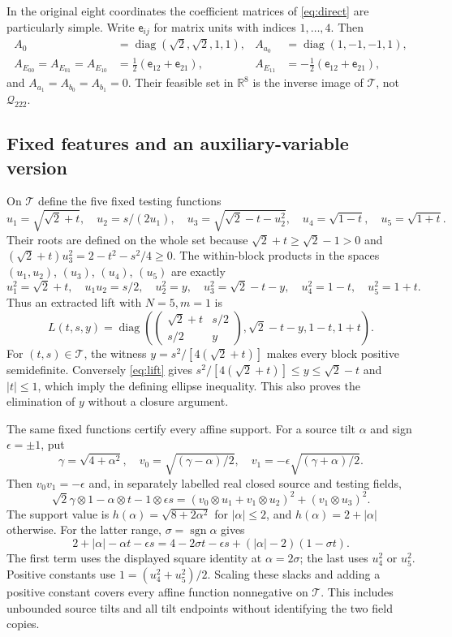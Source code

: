 \documentclass[11pt]{article}
\newcommand{\R}{\mathbb R}
\newcommand{\Q}{\mathcal Q_{222}}
\begin{document}
In the original eight coordinates the coefficient matrices of
\eqref{eq:direct} are particularly simple. Write $\mathsf e_{ij}$ for matrix
units with indices $1,\ldots,4$. Then
\[
 \begin{aligned}
 A_0&=\operatorname{diag}(\sqrt2,\sqrt2,1,1),&
 A_{a_0}&=\operatorname{diag}(1,-1,-1,1),\\
 A_{E_{00}}=A_{E_{01}}=A_{E_{10}}
   &=\tfrac12(\mathsf e_{12}+\mathsf e_{21}),&
 A_{E_{11}}&=-\tfrac12(\mathsf e_{12}+\mathsf e_{21}),
 \end{aligned}
\]
and $A_{a_1}=A_{b_0}=A_{b_1}=0$. Their feasible set in $\R^8$ is
the inverse image of $\mathcal T$, not $\Q$.

\subsection{Fixed features and an auxiliary-variable version}

On $\mathcal T$ define the five fixed testing functions
\[
 u_1=\sqrt{\sqrt2+t},\quad u_2=s/(2u_1),\quad
 u_3=\sqrt{\sqrt2-t-u_2^2},\quad
 u_4=\sqrt{1-t},\quad u_5=\sqrt{1+t}.
\]
Their roots are defined on the whole set because
$\sqrt2+t\geq\sqrt2-1>0$ and
$(\sqrt2+t)u_3^2=2-t^2-s^2/4\geq0$. The within-block products in
the spaces $(u_1,u_2)$, $(u_3)$, $(u_4)$, $(u_5)$ are exactly
\[
 u_1^2=\sqrt2+t,\quad u_1u_2=s/2,\quad u_2^2=y,\quad
 u_3^2=\sqrt2-t-y,\quad u_4^2=1-t,\quad u_5^2=1+t.
\]
Thus an extracted lift with $N=5,m=1$ is
\begin{equation}
 L(t,s,y)=\operatorname{diag}\left(
 \begin{pmatrix}\sqrt2+t&s/2\\s/2&y\end{pmatrix},
 \sqrt2-t-y,1-t,1+t\right).                 \label{eq:lift}
\end{equation}
For $(t,s)\in\mathcal T$, the witness
$y=s^2/[4(\sqrt2+t)]$ makes every block positive semidefinite.
Conversely \eqref{eq:lift} gives
$s^2/[4(\sqrt2+t)]\leq y\leq\sqrt2-t$ and $|t|\leq1$,
which imply the defining ellipse inequality. This also proves the
elimination of $y$ without a closure argument.

The same fixed functions certify every affine support. For a source
tilt $\alpha$ and sign $\epsilon=\pm1$, put
\[
 \gamma=\sqrt{4+\alpha^2},\quad
 v_0=\sqrt{(\gamma-\alpha)/2},\quad
 v_1=-\epsilon\sqrt{(\gamma+\alpha)/2}.
\]
Then $v_0v_1=-\epsilon$ and, in separately labelled real closed
source and testing fields,
\[
 \sqrt2\gamma\otimes1-\alpha\otimes t-1\otimes\epsilon s
 =(v_0\otimes u_1+v_1\otimes u_2)^2+(v_1\otimes u_3)^2.
\]
The support value is $h(\alpha)=\sqrt{8+2\alpha^2}$ for
$|\alpha|\leq2$, and $h(\alpha)=2+|\alpha|$ otherwise.
For the latter range, $\sigma=\operatorname{sgn}\alpha$ gives
\[
 2+|\alpha|-\alpha t-\epsilon s
 =4-2\sigma t-\epsilon s+(|\alpha|-2)(1-\sigma t).
\]
The first term uses the displayed square identity at $\alpha=2\sigma$;
the last uses $u_4^2$ or $u_5^2$. Positive constants use
$1=(u_4^2+u_5^2)/2$. Scaling these slacks and adding a positive
constant covers every affine function nonnegative on $\mathcal T$.
This includes unbounded source tilts and all tilt endpoints without
identifying the two field copies.
\end{document}
